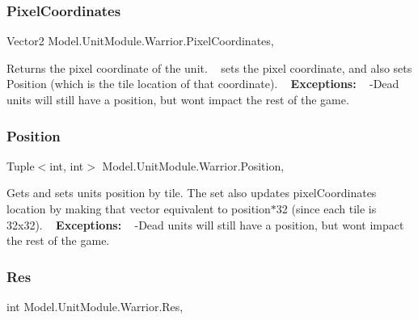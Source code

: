 \subsubsection{\texorpdfstring{Pixel\+Coordinates}{PixelCoordinates}}
{\footnotesize\ttfamily Vector2 Model.\+Unit\+Module.\+Warrior.\+Pixel\+Coordinates\hspace{0.3cm}{\ttfamily [get]}, {\ttfamily [set]}}

Returns the pixel coordinate of the unit. ~\newline
 sets the pixel coordinate, and also sets Position (which is the tile location of that coordinate). ~\newline
{\bfseries Exceptions\+:} ~\newline
 -\/\+Dead units will still have a position, but won\textquotesingle{}t impact the rest of the game. \hypertarget{class_model_1_1_unit_module_1_1_warrior_ad740dd04bc1b284e66e0f01a9597bb83}{}\label{class_model_1_1_unit_module_1_1_warrior_ad740dd04bc1b284e66e0f01a9597bb83} 
\subsubsection{\texorpdfstring{Position}{Position}}
{\footnotesize\ttfamily Tuple$<$int, int$>$ Model.\+Unit\+Module.\+Warrior.\+Position\hspace{0.3cm}{\ttfamily [get]}, {\ttfamily [set]}}

Gets and sets unit\textquotesingle{}s position by tile. The set also updates pixel\+Coordinate\textquotesingle{}s location by making that vector equivalent to position$\ast$32 (since each tile is 32x32). ~\newline
 {\bfseries Exceptions\+:} ~\newline
 -\/\+Dead units will still have a position, but won\textquotesingle{}t impact the rest of the game. \hypertarget{class_model_1_1_unit_module_1_1_warrior_ab785b88f81227bef086caa537e725887}{}\label{class_model_1_1_unit_module_1_1_warrior_ab785b88f81227bef086caa537e725887} 
\subsubsection{\texorpdfstring{Res}{Res}}
{\footnotesize\ttfamily int Model.\+Unit\+Module.\+Warrior.\+Res\hspace{0.3cm}{\ttfamily [get]}, {\ttfamily [set]}}

